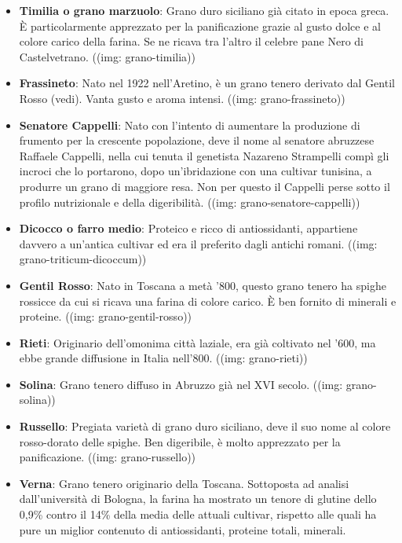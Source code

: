 \begin{itemize}
	\item \textbf{Timilia o grano marzuolo}: Grano duro siciliano già citato in epoca greca. È particolarmente apprezzato per la panificazione grazie al gusto dolce e al colore carico della farina. Se ne ricava tra l'altro il celebre pane Nero di Castelvetrano. ((img: grano-timilia))
	\item \textbf{Frassineto}: Nato nel 1922 nell'Aretino, è un grano tenero derivato dal Gentil Rosso (vedi). Vanta gusto e aroma intensi. ((img: grano-frassineto))
	\item \textbf{Senatore Cappelli}: Nato con l'intento di aumentare la produzione di frumento per la crescente popolazione, deve il nome al senatore abruzzese Raffaele Cappelli, nella cui tenuta il genetista Nazareno Strampelli compì gli incroci che lo portarono, dopo un'ibridazione con una cultivar tunisina, a produrre un grano di maggiore resa. Non per questo il Cappelli perse sotto il profilo nutrizionale e della digeribilità. ((img: grano-senatore-cappelli))
	\item \textbf{Dicocco o farro medio}: Proteico e ricco di antiossidanti, appartiene davvero a un'antica cultivar ed era il preferito dagli antichi romani. ((img: grano-triticum-dicoccum)) 
	\item \textbf{Gentil Rosso}: Nato in Toscana a metà '800, questo grano tenero ha spighe rossicce da cui si ricava una farina di colore carico. È ben fornito di minerali e proteine. ((img: grano-gentil-rosso))
	\item \textbf{Rieti}: Originario dell'omonima città laziale, era già coltivato nel '600, ma ebbe grande diffusione in Italia nell’800. ((img: grano-rieti))
	\item \textbf{Solina}: Grano tenero diffuso in Abruzzo già nel XVI secolo. ((img: grano-solina))
	\item \textbf{Russello}: Pregiata varietà di grano duro siciliano, deve il suo nome al colore rosso-dorato delle spighe. Ben digeribile, è molto apprezzato per la panificazione. ((img: grano-russello))
	\item \textbf{Verna}: Grano tenero originario della Toscana. Sottoposta ad analisi dall'università di Bologna, la farina ha mostrato un tenore di glutine dello 0,9\% contro il 14\% della media delle attuali cultivar, rispetto alle quali ha pure un miglior contenuto di antiossidanti, proteine totali, minerali.
\end{itemize}